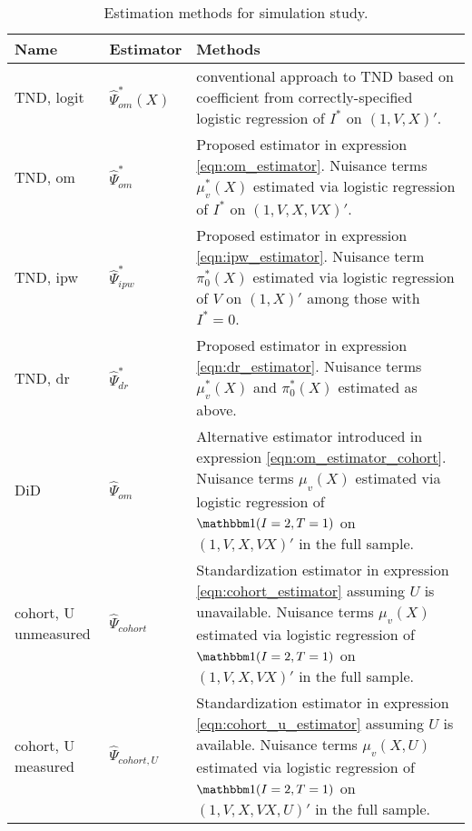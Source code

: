 \begin{appendix}
\begin{table}[p]
    \centering
    \caption{Estimation methods for simulation study.}\label{tab:methods}
    \begin{tabular}{llp{3in}}
        \toprule
        Name & Estimator & Methods \\
        \midrule
        TND, logit & $\widehat{\Psi}_{om}^*(X)$ & conventional approach to TND based on coefficient from correctly-specified logistic regression of $I^*$ on $(1, V, X)'$. \\
        \addlinespace[1em]
        TND, om & $\widehat{\Psi}^*_{om}$ & Proposed estimator in expression \ref{eqn:om_estimator}. Nuisance terms $\mu_v^*(X)$ estimated via logistic regression of $I^*$ on $(1, V, X, VX)'$.  \\
        \addlinespace[1em]
        TND, ipw & $\widehat{\Psi}^*_{ipw}$ & Proposed estimator in expression \ref{eqn:ipw_estimator}. Nuisance term $\pi_0^*(X)$ estimated via logistic regression of $V$ on $(1, X)'$ among those with $I^*=0$. \\
        \addlinespace[1em]
        TND, dr & $\widehat{\Psi}^*_{dr}$ & Proposed estimator in expression \ref{eqn:dr_estimator}. Nuisance terms $\mu_v^*(X)$ and $\pi_0^*(X)$ estimated as above. \\
        \addlinespace[1em]
        DiD & $\widehat{\Psi}_{om}$ &  Alternative estimator introduced in expression \ref{eqn:om_estimator_cohort}. Nuisance terms $\mu_v(X)$ estimated via logistic regression of $\mathbbm 1 (I=2, T=1)$ on $(1, V, X, VX)'$ in the full sample. \\
        \addlinespace[1em]
        cohort, U unmeasured & $\widehat{\Psi}_{cohort}$ & Standardization estimator in expression \ref{eqn:cohort_estimator} assuming $U$ is unavailable. Nuisance terms $\mu_v(X)$ estimated via logistic regression of $\mathbbm 1 (I=2, T=1)$ on $(1, V, X, VX)'$ in the full sample. \\ 
        \addlinespace[1em]
        cohort, U measured & $\widehat{\Psi}_{cohort,U}$ & Standardization estimator in expression \ref{eqn:cohort_u_estimator} assuming $U$ is available. Nuisance terms $\mu_v(X,U)$ estimated via logistic regression of $\mathbbm 1 (I=2, T=1)$ on $(1, V, X, VX, U)'$ in the full sample. \\ 
        \bottomrule
    \end{tabular}
\end{table}

\newcommand*{\TableHead}[1]{\multicolumn{1}{p{3em}}{\centering\hskip0pt#1}}
\newcommand*{\TableHeadd}[1]{\multicolumn{1}{p{4em}}{\centering\hskip0pt#1}}
\newcommand*{\TableHeaddd}[1]{\multicolumn{1}{p{7em}}{\centering\hskip0pt#1}}



\end{appendix}
